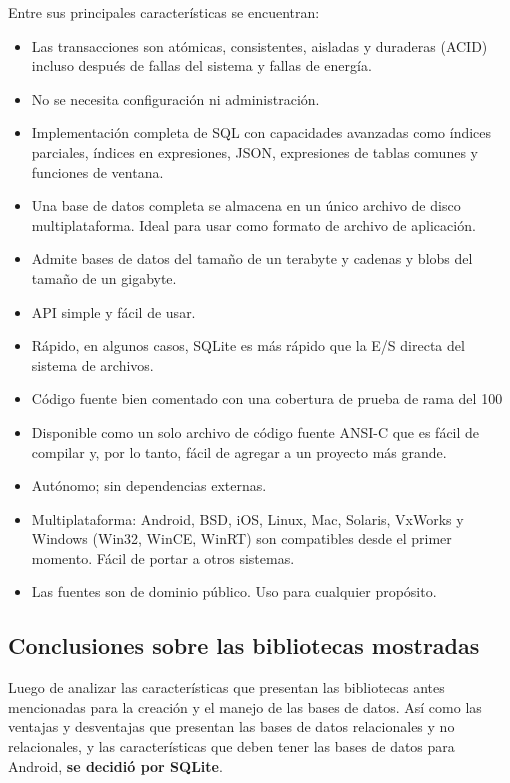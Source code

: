Entre sus principales características se encuentran:
\begin{itemize}

\item	Las transacciones son atómicas, consistentes, aisladas y duraderas (ACID) incluso después de fallas del sistema y fallas de energía.
\item	No se necesita configuración ni administración.
\item	Implementación completa de SQL con capacidades avanzadas como índices parciales, índices en expresiones, JSON, expresiones de tablas comunes y funciones de ventana.
\item	Una base de datos completa se almacena en un único archivo de disco multiplataforma. Ideal para usar como formato de archivo de aplicación.
\item	Admite bases de datos del tamaño de un terabyte y cadenas y blobs del tamaño de un gigabyte.
\item	API simple y fácil de usar.
\item	Rápido, en algunos casos, SQLite es más rápido que la E/S directa del sistema de archivos.
\item	Código fuente bien comentado con una cobertura de prueba de rama del 100 %
\item	Disponible como un solo archivo de código fuente ANSI-C que es fácil de compilar y, por lo tanto, fácil de agregar a un proyecto más grande.
\item	Autónomo; sin dependencias externas.
\item	Multiplataforma: Android, BSD, iOS, Linux, Mac, Solaris, VxWorks y Windows (Win32, WinCE, WinRT) son compatibles desde el primer momento. Fácil de portar a otros sistemas.
\item	Las fuentes son de dominio público. Uso para cualquier propósito.
\end{itemize}

\subsection{Conclusiones sobre las bibliotecas mostradas}\label{chapter:introduction}

Luego de analizar las características que presentan las bibliotecas antes mencionadas para la creación y el manejo de las bases de datos. Así como las ventajas y desventajas que presentan las bases de datos relacionales y no relacionales, y las características que deben tener las bases de datos para Android, \textbf{se decidió por SQLite}.


